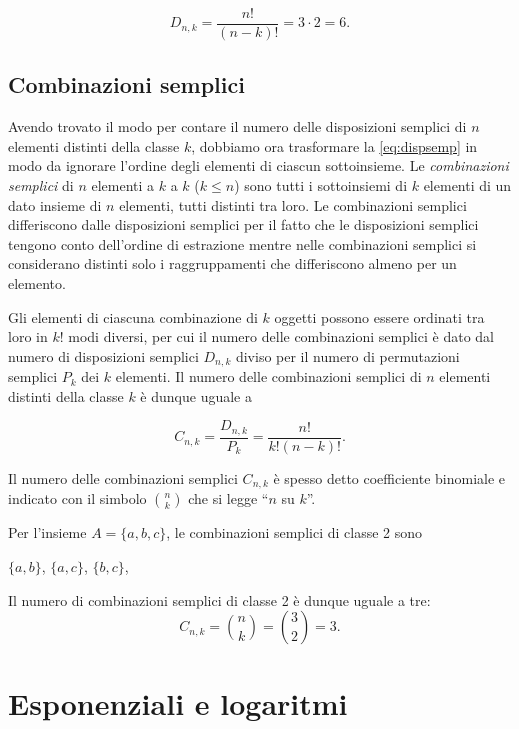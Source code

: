 \documentclass[
  11pt,
]{krantz}
\theoremstyle{definition}
\theoremstyle{definition}
\theoremstyle{definition}
\theoremstyle{definition}
\theoremstyle{remark}
\begin{document}
\[
D_{n,k} = \frac{n!}{(n-k)!} = 3 \cdot 2 = 6.
\]

\hypertarget{combinazioni-semplici}{%
\section{Combinazioni semplici}\label{combinazioni-semplici}}

Avendo trovato il modo per contare il numero delle disposizioni semplici di \(n\) elementi distinti della classe \(k\), dobbiamo ora trasformare la \eqref{eq:dispsemp} in modo da ignorare l'ordine degli elementi di ciascun sottoinsieme. Le \emph{combinazioni semplici} di \(n\) elementi a \(k\) a \(k\) (\(k \leq n\)) sono tutti i sottoinsiemi di \(k\) elementi di un dato insieme di \(n\) elementi, tutti distinti tra loro. Le combinazioni semplici differiscono dalle disposizioni semplici per il fatto che le disposizioni semplici tengono conto dell'ordine di estrazione mentre nelle combinazioni semplici si considerano distinti solo i raggruppamenti che differiscono almeno per un elemento.

Gli elementi di ciascuna combinazione di \(k\) oggetti possono essere ordinati tra loro in \(k!\) modi diversi, per cui il numero delle combinazioni semplici è dato dal numero di disposizioni semplici \(D_{n,k}\) diviso per il numero di permutazioni semplici \(P_k\) dei \(k\) elementi. Il numero delle combinazioni semplici di \(n\) elementi distinti della classe \(k\) è dunque uguale a

\begin{equation}
C_{n,k} = \frac{D_{n,k}}{P_k} = \frac{n!}{k!(n-k)!}.
\label{eq:combsemp}
\end{equation}

Il numero delle combinazioni semplici \(C_{n,k}\) è spesso detto coefficiente binomiale e indicato con il simbolo \(\binom{n}{k}\) che si legge ``\(n\) su \(k\)''.

Per l'insieme \(A = \{a, b, c\}\), le combinazioni semplici di classe 2 sono

\begin{center}
$\{a, b\}$, $\{a, c\}$, $\{b, c\}$,
\end{center}

Il numero di combinazioni semplici di classe 2 è dunque uguale a tre: \[
C_{n,k} = \binom{n}{k} = \binom{3}{2} = 3.
\]

\hypertarget{funs-exp-log}{%
\chapter{Esponenziali e logaritmi}\label{funs-exp-log}}
\end{document}

